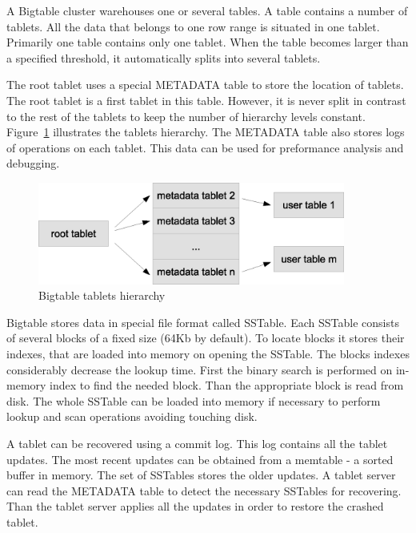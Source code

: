 A Bigtable cluster warehouses one or several tables.
A table contains a number of tablets. 
All the data that belongs to one row range is situated in one tablet.
Primarily one table contains only one tablet.
When the table becomes larger than a specified threshold, it automatically splits into several tablets.

The root tablet uses a special METADATA table to store the location of tablets.
The root tablet is a first tablet in this table.
However, it is never split in contrast to the rest of the tablets to keep the number of hierarchy levels constant.
Figure~\ref{fig:bigtable_tablets_hierarchy} illustrates the tablets hierarchy.
The METADATA table also stores logs of operations on each tablet.
This data can be used for preformance analysis and debugging.  

\begin{figure}
  \centering
  \includegraphics [width=0.9\textwidth]{images/bigtable_tablets_hierarchy}
  \caption{Bigtable tablets hierarchy}
  \label{fig:bigtable_tablets_hierarchy}
\end{figure}

Bigtable stores data in special file format called SSTable.
Each SSTable consists of several blocks of a fixed size (64Kb by default). 
To locate blocks it stores their indexes, that are loaded into memory on opening the SSTable.
The blocks indexes considerably decrease the lookup time.
First the binary search is performed on in-memory index to find the needed block.
Than the appropriate block is read from disk.
The whole SSTable can be loaded into memory if necessary to perform lookup and scan operations avoiding touching disk.

A tablet can be recovered using a commit log.
This log contains all the tablet updates.
The most recent updates can be obtained from a memtable - a sorted buffer in memory.
The set of SSTables stores the older updates. 
A tablet server can read the METADATA table to detect the necessary SSTables for recovering.
Than the tablet server applies all the updates in order to restore the crashed tablet. 
  

